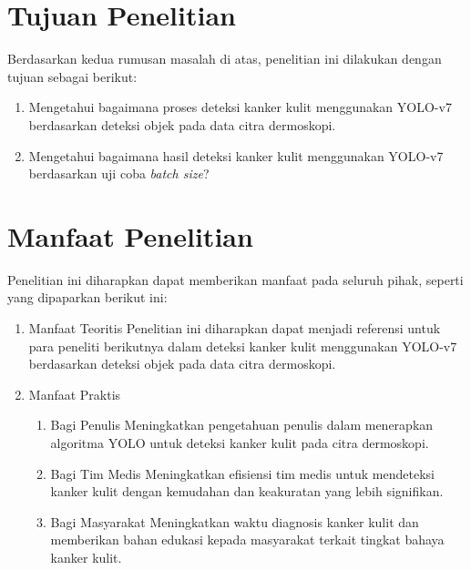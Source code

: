     \section{Tujuan Penelitian}
    Berdasarkan kedua rumusan masalah di atas, penelitian ini dilakukan dengan tujuan sebagai berikut:
    \begin{enumerate}
        \item Mengetahui bagaimana proses deteksi kanker kulit menggunakan YOLO-v7 berdasarkan deteksi objek pada data citra dermoskopi.
        \item Mengetahui bagaimana hasil deteksi kanker kulit menggunakan YOLO-v7 berdasarkan uji coba \textit{batch size}?
    \end{enumerate}

    \section{Manfaat Penelitian}
    Penelitian ini diharapkan dapat memberikan manfaat pada seluruh pihak, seperti yang dipaparkan berikut ini:
    \begin{enumerate}
        \item Manfaat Teoritis
        Penelitian ini diharapkan dapat menjadi referensi untuk para peneliti berikutnya dalam deteksi kanker kulit menggunakan YOLO-v7 berdasarkan deteksi objek pada data citra dermoskopi.

        \item Manfaat Praktis
        \begin{enumerate}
            \item Bagi Penulis
            Meningkatkan pengetahuan penulis dalam menerapkan algoritma YOLO untuk deteksi kanker kulit pada citra dermoskopi.

            \item Bagi Tim Medis
            Meningkatkan efisiensi tim medis untuk mendeteksi kanker kulit dengan kemudahan dan keakuratan yang lebih signifikan.

            \item Bagi Masyarakat
            Meningkatkan waktu diagnosis kanker kulit dan memberikan bahan edukasi kepada masyarakat terkait tingkat bahaya kanker kulit.
        \end{enumerate}
    \end{enumerate}

